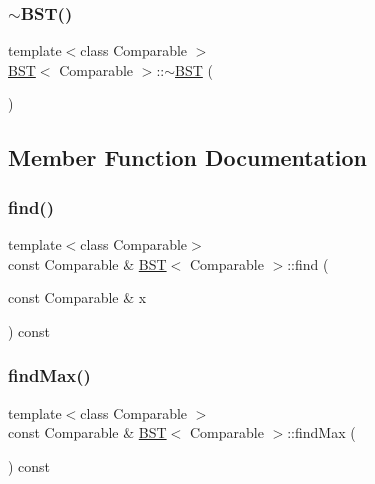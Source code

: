 \mbox{\label{class_b_s_t_abf3125f968641c8726101c5dd18f36be}} 
\subsubsection{\texorpdfstring{$\sim$\+B\+S\+T()}{~BST()}}
{\footnotesize\ttfamily template$<$class Comparable $>$ \\
\hyperlink{class_b_s_t}{B\+ST}$<$ Comparable $>$\+::$\sim$\hyperlink{class_b_s_t}{B\+ST} (\begin{DoxyParamCaption}{ }\end{DoxyParamCaption})}



\subsection{Member Function Documentation}
\mbox{\label{class_b_s_t_aaf4eb6869f68db0069534f7b2dfbe53b}} 
\subsubsection{\texorpdfstring{find()}{find()}}
{\footnotesize\ttfamily template$<$class Comparable$>$ \\
const Comparable \& \hyperlink{class_b_s_t}{B\+ST}$<$ Comparable $>$\+::find (\begin{DoxyParamCaption}\item[{const Comparable \&}]{x }\end{DoxyParamCaption}) const}

\mbox{\label{class_b_s_t_a03485f3b0b150f1e69a12c28d26d8092}} 
\subsubsection{\texorpdfstring{find\+Max()}{findMax()}}
{\footnotesize\ttfamily template$<$class Comparable $>$ \\
const Comparable \& \hyperlink{class_b_s_t}{B\+ST}$<$ Comparable $>$\+::find\+Max (\begin{DoxyParamCaption}{ }\end{DoxyParamCaption}) const}

